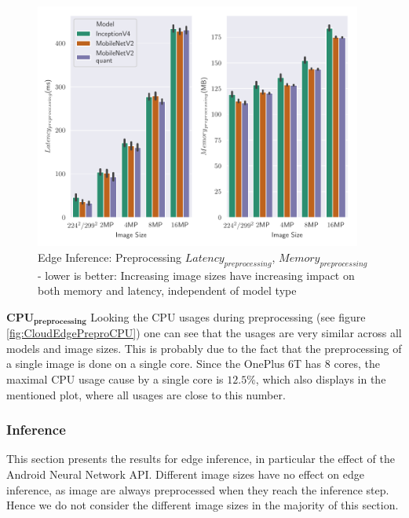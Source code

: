 \begin{figure}[!htb]
\centering
\includegraphics[width=0.96\textwidth]{./Bilder/single_plots/edge_inference_plots/Edge_Inference_Preprocessing.pdf}
\caption[Edge Inference: Preprocessing $Latency_{preprocessing}$, $Memory_{preprocessing}$]{Edge Inference: Preprocessing $Latency_{preprocessing}$, $Memory_{preprocessing}$ -  lower is better: Increasing image sizes have increasing impact on both memory and latency, independent of model type}
\label{fig:EdgePrepro}
\end{figure}
$\mathbf{CPU_{preprocessing}}$
Looking the CPU usages during preprocessing (see figure \ref{fig:CloudEdgePreproCPU}) one can see that the usages are very similar across all models and image sizes. This is probably due to the fact that the preprocessing of a single image is done on a single core. Since the OnePlus 6T has $8$ cores, the maximal CPU usage cause by a single core is $12.5\%$, which also displays in the mentioned plot, where all usages are close to this number.

\FloatBarrier
\subsubsection{Inference}
This section presents the results for edge inference, in particular the effect of the Android Neural Network API.
Different image sizes have no effect on edge inference, as image are always preprocessed when they reach the inference step.
Hence we do not consider the different image sizes in the majority of this section.


